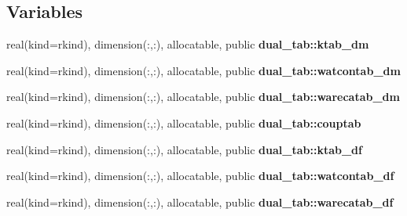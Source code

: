 \subsection*{Variables}
\begin{DoxyCompactItemize}
\item 
real(kind=rkind), dimension(\+:,\+:), allocatable, public {\bf dual\+\_\+tab\+::ktab\+\_\+dm}
\item 
real(kind=rkind), dimension(\+:,\+:), allocatable, public {\bf dual\+\_\+tab\+::watcontab\+\_\+dm}
\item 
real(kind=rkind), dimension(\+:,\+:), allocatable, public {\bf dual\+\_\+tab\+::warecatab\+\_\+dm}
\item 
real(kind=rkind), dimension(\+:,\+:), allocatable, public {\bf dual\+\_\+tab\+::couptab}
\item 
real(kind=rkind), dimension(\+:,\+:), allocatable, public {\bf dual\+\_\+tab\+::ktab\+\_\+df}
\item 
real(kind=rkind), dimension(\+:,\+:), allocatable, public {\bf dual\+\_\+tab\+::watcontab\+\_\+df}
\item 
real(kind=rkind), dimension(\+:,\+:), allocatable, public {\bf dual\+\_\+tab\+::warecatab\+\_\+df}
\end{DoxyCompactItemize}
